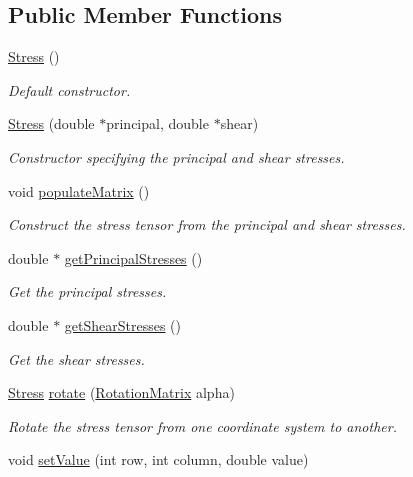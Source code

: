 \subsection*{\-Public \-Member \-Functions}
\begin{DoxyCompactItemize}
\item 
\hyperlink{classStress_aa01e83a3f6791cbadc5a368e3a40515e}{\-Stress} ()
\begin{DoxyCompactList}\small\item\em \-Default constructor. \end{DoxyCompactList}\item 
\hyperlink{classStress_ae4e2f6250e3bdd4d3d78a9c6bdde7bab}{\-Stress} (double $\ast$principal, double $\ast$shear)
\begin{DoxyCompactList}\small\item\em \-Constructor specifying the principal and shear stresses. \end{DoxyCompactList}\item 
void \hyperlink{classStress_aa395d5763df8feb4689e0c5524c9e562}{populate\-Matrix} ()
\begin{DoxyCompactList}\small\item\em \-Construct the stress tensor from the principal and shear stresses. \end{DoxyCompactList}\item 
double $\ast$ \hyperlink{classStress_aca57d2719f43701dd2ebf2ab00afa539}{get\-Principal\-Stresses} ()
\begin{DoxyCompactList}\small\item\em \-Get the principal stresses. \end{DoxyCompactList}\item 
double $\ast$ \hyperlink{classStress_afe8214b8e9061930e6598e1970fd61f5}{get\-Shear\-Stresses} ()
\begin{DoxyCompactList}\small\item\em \-Get the shear stresses. \end{DoxyCompactList}\item 
\hyperlink{classStress}{\-Stress} \hyperlink{classStress_a8bbcd34d10748bf6febd32213ac5bf8e}{rotate} (\hyperlink{classRotationMatrix}{\-Rotation\-Matrix} alpha)
\begin{DoxyCompactList}\small\item\em \-Rotate the stress tensor from one coordinate system to another. \end{DoxyCompactList}\item 
void \hyperlink{classMatrix33_a6cdcec77fd089b2e73ad7ae85ecff30b}{set\-Value} (int row, int column, double value)

\end{DoxyCompactItemize}
